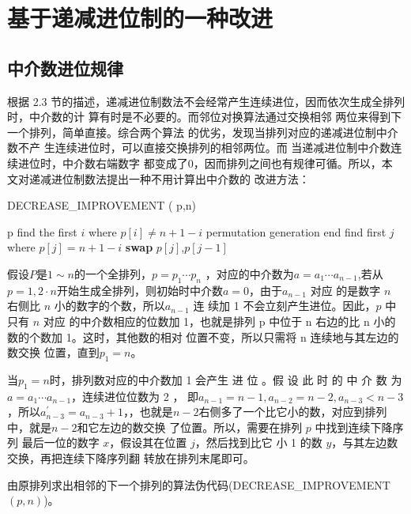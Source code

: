 \documentclass[6pt, twocolumn]{ctexart}
\begin{document}
\section{基于递减进位制的一种改进}
\subsection{中介数进位规律}
根据 2.3 节的描述，递减进位制数法不会经常产生连续进位，因而依次生成全排列时，中介数的计 算有时是不必要的。而邻位对换算法通过交换相邻 两位来得到下一个排列，简单直接。综合两个算法 的优劣，发现当排列对应的递减进位制中介数不产 生连续进位时，可以直接交换排列的相邻两位。而 当递减进位制中介数连续进位时，中介数右端数字 都变成了0，因而排列之间也有规律可循。所以，本 文对递减进位制数法提出一种不用计算出中介数的 改进方法：
\begin{algorithm}
\caption{DECREASE\_IMPROVEMENT ( p,n)}
\label{alg2}
\begin{algorithmic}[1]
\PRINT p
\STATE find the first $i$ where $p[i] \ne n+1-i$
\RETURN permutation generation end
\ENDIF
{}
\STATE find first $j$ where $p[j] = n+1 -i$
\ENDFOR
\STATE \textbf{swap} $p[j]$,$p[j-1]$
\ENDFOR
{}
\ENDFOR
\ENDFOR
\end{algorithmic}
\end{algorithm}

假设$P$是$1 \sim n$的一个全排列，$p = p_1 \cdots p_n$ ，对应的中介数为$a = a_1 \cdots a_{n-1}$,若从$p = 1,2 \cdot n$开始生成全排列，则初始时中介数$𝑎 = 0$，由于$a_{n-1}$ 对应 的是数字 $n$ 右侧比 $n$ 小的数字的个数，所以$a_{n-1}$ 连 续加 1 不会立刻产生进位。因此，$p$ 中只有 $n$ 对应 的中介数相应的位数加 1，也就是排列 p 中位于 n 右边的比 n 小的数的个数加 1。这时，其他数的相对 位置不变，所以只需将 n 连续地与其左边的数交换 位置，直到$p_1=n$。

当$p_1 =n$时，排列数对应的中介数加 1 会产生 进 位 。假 设 此 时 的 中 介 数 为$a = a_1 \cdots a_{n-1}$，连续进位位数为 2 ， 即$a_{n-1}=n-1,a_{n-2}=n-2 ,a_{n-3}<n-3$，所以$a_{n-3}^{'}=a_{n-3}+1$，，也就是$n − 2$右侧多了一个比它小的数，对应到排列中，就是$n − 2$和它左边的数交换 了位置。所以，需要在排列 $p$ 中找到连续下降序列 最后一位的数字 $x$，假设其在位置 $j$，然后找到比它 小 1 的数 $y$，与其左边数交换，再把连续下降序列翻 转放在排列末尾即可。

由原排列求出相邻的下一个排列的算法伪代码(DECREASE\_IMPROVEMENT $( p,n)$)。
\end{document}
